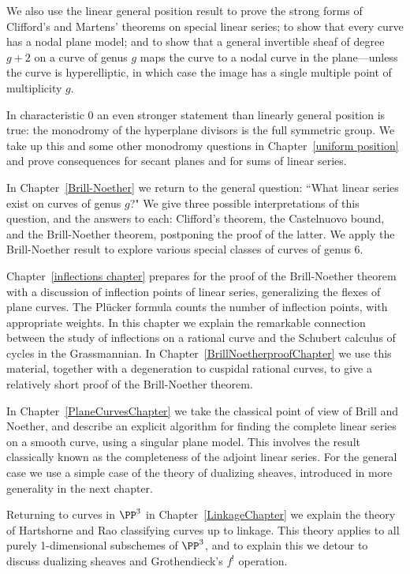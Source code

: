 We also
use the linear general position result to prove the strong forms of Clifford's and Martens' theorems
on special linear series; to show that every curve has a nodal plane model; and to show that a 
general invertible sheaf  of degree $g+2$ on a curve of genus $g$  maps the curve to a nodal curve
in the plane---unless the curve is hyperelliptic, in which case the image has a single multiple point of
multiplicity $g$.

In characteristic 0 an even stronger statement than linearly general position is true: the monodromy of the hyperplane divisors is the full symmetric group. We take up this
and some other monodromy questions in Chapter~\ref{uniform position} and prove consequences
for secant planes and for sums of linear series.

In Chapter~\ref{Brill-Noether} we return to the general question: ``What linear series exist on curves of genus $g$?" We give three possible interpretations of this question, and the answers to each: Clifford's theorem, the Castelnuovo bound, and the Brill-Noether theorem, postponing the proof of the latter. 
We apply the Brill-Noether result to explore  various special classes of curves of genus 6.

Chapter~\ref{inflections chapter} prepares for the proof of the Brill-Noether theorem 
with a discussion of inflection points of linear series, generalizing the flexes of plane curves. The Pl\"ucker formula
counts the number of inflection points, with appropriate weights. In this chapter we explain
the remarkable connection between the study of inflections on a rational curve and the Schubert calculus of cycles in the Grassmannian. In Chapter~\ref{BrillNoetherproofChapter} we use this material, together with a degeneration to cuspidal rational curves, to give a relatively short proof of the Brill-Noether theorem.

In Chapter~\ref{PlaneCurvesChapter} we take the classical point of view of Brill and Noether,
and describe an explicit algorithm for finding the complete linear series on a smooth curve, using a singular plane model. This involves the result classically known as the completeness of the adjoint linear series. For the general case we use a simple case of the theory of dualizing sheaves, introduced in more generality in the next chapter.

Returning to curves in $\PP^{3}$ in Chapter~\ref{LinkageChapter} we explain the theory of Hartshorne and Rao classifying curves up to linkage. This theory applies to all purely 1-dimensional subschemes of $\PP^{3}$, and to explain this
we detour to discuss dualizing sheaves and Grothendieck's $f^{!}$ operation.

